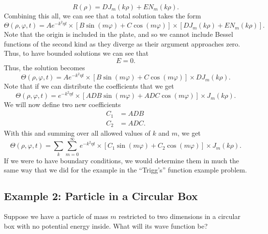 \documentclass[11pt]{report}
\newcommand{\fpar}[1]{\left({#1}\right)}
\newcommand{\fbrac}[1]{\left[{#1}\right]}
\begin{document}
    \begin{equation*}
        R\fpar{\rho} = DJ_m\fpar{k\rho}+EN_m\fpar{k\rho}.
    \end{equation*}
Combining this all, we can see that a total solution takes the form
    \begin{equation*}
        \Theta\fpar{\rho,\varphi,t} = Ae^{-k^2\eta t}\times\fbrac{B\sin\fpar{m\varphi}+C\cos\fpar{m\varphi}}
        \times\fbrac{DJ_m\fpar{k\rho}+EN_m\fpar{k\rho}}.
    \end{equation*}
Note that the origin is included in the plate, and so we cannot include Bessel functions of the second kind as they diverge as their argument approaches zero. Thus, to have bounded solutions we can see that
    \[E=0.\]
Thus, the solution becomes
\begin{equation*}
        \Theta\fpar{\rho,\varphi,t} = Ae^{-k^2\eta t}\times\fbrac{B\sin\fpar{m\varphi}+C\cos\fpar{m\varphi}}
        \times DJ_m\fpar{k\rho}.
    \end{equation*}
Note that if we can distribute the coefficients that we get
    \begin{equation*}
        \Theta\fpar{\rho,\varphi,t} = e^{-k^2\eta t}\times\fbrac{ADB\sin\fpar{m\varphi}+ADC\cos\fpar{m\varphi}}\times J_m\fpar{k\rho}.
    \end{equation*}
We will now define two new coefficients
    \begin{align*}
        C_1 &= ADB\\
        C_2 &= ADC.
    \end{align*}
With this and summing over all allowed values of $k$ and $m$, we get
    \begin{equation*}
        \Theta\fpar{\rho,\varphi,t} = \sum_{k}\sum_{m=0}^\infty e^{-k^2\eta t}\times\fbrac{C_1\sin\fpar{m\varphi}+C_2\cos\fpar{m\varphi}}\times J_m\fpar{k\rho}.
    \end{equation*}
If we were to have boundary conditions, we would determine them in much the same way that we did for the example in the ``Trigg's'' function example problem.
    
\subsection{Example 2: Particle in a Circular Box}

Suppose we have a particle of mass $m$ restricted to two dimensions in a circular box with no potential energy inside. What will its wave function be?\\
\end{document}
